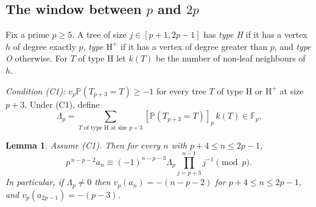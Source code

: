 \documentclass[11pt]{article}
\newtheorem{lemma}{Lemma}[section]
\theoremstyle{remark}
\newcommand{\Prob}{\mathbb P}
\newcommand{\res}[1]{[#1]_p}
\begin{document}
\subsection{The window between $p$ and $2p$}
Fix a prime $p\ge5$. A tree of size $j\in[p+1,2p-1]$ has \emph{type H} if it has a vertex $h$ of degree exactly $p$, \emph{type $\mathrm H^+$} if it has a vertex of degree greater than $p$, and \emph{type O} otherwise. For $T$ of type H let $k(T)$ be the number of non-leaf neighbours of $h$.

\emph{Condition (C1):} $v_p\Prob(T_{p+3}=T)\ge-1$ for every tree $T$ of type H or $\mathrm H^+$ at size $p+3$. Under (C1), define
\[
 \Lambda_p=\sum_{T\text{ of type H at size }p+3}\res{\Prob(T_{p+3}=T)}\,k(T)\in\mathbb F_p .
\]

\begin{lemma}\label{lem:window-law}
Assume (C1). Then for every $n$ with $p+4\le n\le2p-1$,
\[
 p^{\,n-p-2}a_n\equiv(-1)^{n-p-3}\Lambda_p\prod_{j=p+3}^{n-1}j^{-1}\pmod p .
\]
In particular, if $\Lambda_p\ne0$ then $v_p(a_n)=-(n-p-2)$ for $p+4\le n\le2p-1$, and $v_p(a_{2p-1})=-(p-3)$.
\end{lemma}
\end{document}
